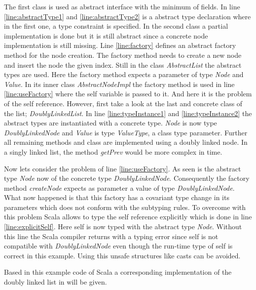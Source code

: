 The first class is used as abstract interface with the minimum of fields.
In line \ref{line:abstractType1} and \ref{line:abstractType2} is a
abstract type declaration where in the first one, a type constraint is
specified.  In the second class a partial implementation is done but it is
still abstract since a concrete node implementation is still missing. Line
\ref{line:factory} defines an abstract factory method for the node
creation. The factory method needs to create a new node and insert the
node the given index. Still in the class \emph{AbstractList} the abstract
types are used. Here the factory method expects a parameter of type
\emph{Node} and \emph{Value}. In its inner class \emph{AbstractNodeImpl}
the factory method is used in line \ref{line:useFactory} where the
self variable is passed to it. And here it is the problem of the self
reference. However, first take a look at the last and concrete class
of the list; \emph{DoublyLinkedList}. In line \ref{line:typeInstance1}
and \ref{line:typeInstance2} the abstract types are instantiated with
a concrete type. \emph{Node} is now type \emph{DoublyLinkedNode} and
\emph{Value} is type \emph{ValueType}, a class type parameter. Further all
remaining methods and class are implemented using a doubly linked node.
In a singly linked list, the method \emph{getPrev} would be more complex
in time.

Now lets consider the problem of line \ref{line:useFactory}. As
seen is the abstract type \emph{Node} now of the concrete
type \emph{DoublyLinkedNode}.  Consequently the factory
method \emph{createNode} expects as parameter a value of type
\emph{DoublyLinkedNode}. What now happened is that this factory has a
covariant type change in its parameters which does not conform with the
subtyping rules. To overcome with this problem Scala allows to type the
self reference explicitly which is done in line \ref{line:explicitSelf}.
Here self is now typed with the abstract type \emph{Node}. Without this
line the Scala compiler returns with a typing error since self is not
compatible with \emph{DoublyLinkedNode} even though the run-time
type of self is correct in this example. Using this unsafe structures
like casts can be avoided.



Based in this example code of Scala a corresponding implementation of the 
doubly linked list in \ooplss will be given.



